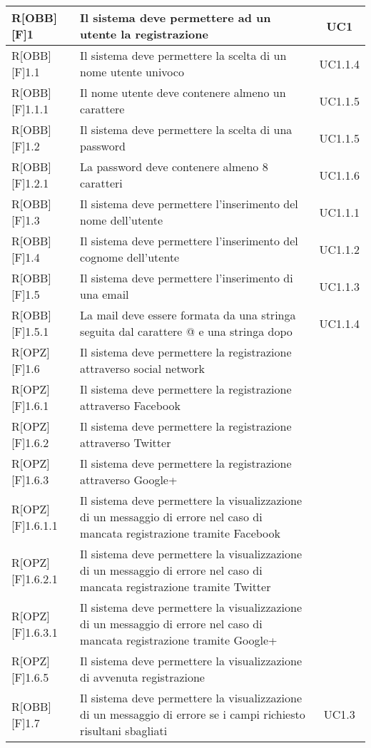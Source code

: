 \begin{longtable}{|l|p{}|c|}
		R[OBB][F]1 & Il sistema deve permettere ad un utente la registrazione & UC1 \\ \midrule
		R[OBB][F]1.1 & Il sistema deve permettere la scelta di un nome utente univoco & UC1.1.4 \\ \midrule
		R[OBB][F]1.1.1 & Il nome utente deve contenere almeno un carattere & UC1.1.5 \\ \midrule
		R[OBB][F]1.2 & Il sistema deve permettere la scelta di una password & UC1.1.5 \\ \midrule
		R[OBB][F]1.2.1 & La password deve contenere almeno 8 caratteri & UC1.1.6 \\ \midrule
		R[OBB][F]1.3 & Il sistema deve permettere l'inserimento del nome dell'utente & UC1.1.1 \\ \midrule
		R[OBB][F]1.4 & Il sistema deve permettere l'inserimento del cognome dell'utente & UC1.1.2 \\ \midrule
		R[OBB][F]1.5 & Il sistema deve permettere l'inserimento di una email & UC1.1.3 \\ \midrule
		R[OBB][F]1.5.1 & La mail deve essere formata da una stringa seguita dal carattere @ e una stringa dopo & UC1.1.4 \\ \midrule
		R[OPZ][F]1.6 & Il sistema deve permettere la registrazione attraverso social network & \\ \midrule
		R[OPZ][F]1.6.1 & Il sistema deve permettere la registrazione attraverso Facebook & \\ \midrule
		R[OPZ][F]1.6.2 & Il sistema deve permettere la registrazione attraverso Twitter & \\ \midrule
		R[OPZ][F]1.6.3 & Il sistema deve permettere la registrazione attraverso Google+ & \\ \midrule 
		R[OPZ][F]1.6.1.1 & Il sistema deve permettere la visualizzazione di un messaggio di errore nel caso di mancata registrazione tramite Facebook & \\ \midrule
		R[OPZ][F]1.6.2.1 & Il sistema deve permettere la visualizzazione di un messaggio di errore nel caso di mancata registrazione tramite Twitter & \\ \midrule
		R[OPZ][F]1.6.3.1 & Il sistema deve permettere la visualizzazione di un messaggio di errore nel caso di mancata registrazione tramite Google+ & \\ \midrule
		R[OPZ][F]1.6.5 & Il sistema deve permettere la visualizzazione di avvenuta registrazione & \\ \midrule
		R[OBB][F]1.7 & Il sistema deve permettere la visualizzazione di un messaggio di errore se i campi richiesto risultani sbagliati & UC1.3 \\ \midrule
		

\end{longtable}
